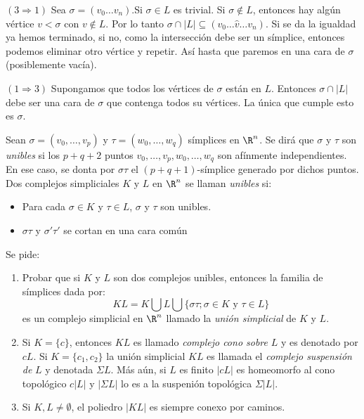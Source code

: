 \documentclass[twoside]{article}
\begin{document}
\begin{solucion}
$(3\Rightarrow 1)$ Sea $\sigma=(v_0\dots v_n)$.Si $\sigma\in L$ es trivial. Si $\sigma\notin L$, entonces hay algún vértice $v<\sigma$ con $v\notin L$. Por lo tanto $\sigma\cap|L|\subseteq (v_0\dots \hat{v}\dots v_n)$. Si se da la igualdad ya hemos terminado, si no, como la intersección debe ser un símplice, entonces podemos eliminar otro vértice y repetir. Así hasta que paremos en una cara de $\sigma$ (posiblemente vacía).

$(1\Rightarrow 3)$ Supongamos que todos los vértices de $\sigma$ están en $L$. Entonces $\sigma\cap |L|$ debe ser una cara de $\sigma$ que contenga todos su vértices. La única que cumple esto es $\sigma$.
\end{solucion}

\newpage

\begin{ejercicio}{1.2}
Sean $σ = (v_0,\dots,v_p)$ y $τ = (w_0,\dots,w_q)$ símplices en $\R^n$.
Se dirá que $σ$ y $τ$ son \emph{unibles} si los $p+q+2$ puntos $v_0,\dots,v_p,w_0,\dots,w_q$ son afínmente independientes.
En ese caso, se donta por $στ$ el $(p+q+1)$-símplice generado por dichos puntos.
Dos complejos simpliciales $K$ y $L$ en $\R^n$ se llaman \emph{unibles} si:
\begin{itemize}
\item Para cada $σ \in K$ y $τ \in L$, $σ$ y $τ$ son unibles.
\item $στ$ y $σ'τ'$ se cortan en una cara común
\end{itemize}
Se pide:
\begin{enumerate}
\item Probar que si $K$ y $L$ son dos complejos unibles, entonces la familia de símplices dada por:
\[ KL = K \bigcup L \bigcup \{στ; σ \in K \text{ y }τ \in L\} \]
es un complejo simplicial en $\R^n$ llamado la \emph{unión simplicial} de $K$ y $L$.
\item Si $K = \{c\}$, entonces $KL$ es llamado \emph{complejo cono sobre} $L$ y es denotado por $cL$.
Si $K = \{c_1,c_2\}$ la unión simplicial $KL$ es llamada el \emph{complejo suspensión de} $L$ y denotada $ΣL$.
Más aún, si $L$ es finito $|cL|$ es homeomorfo al cono topológico $c|L|$ y $|ΣL|$ lo es a la suspenión topológica $Σ|L|$.
\item Si $K, L \neq \emptyset$, el poliedro $|KL|$ es siempre conexo por caminos.
\end{enumerate}
\end{ejercicio}
\end{document}
